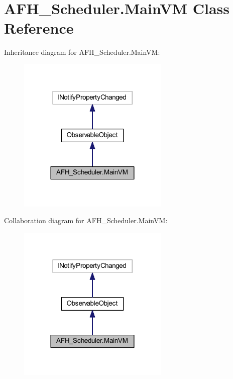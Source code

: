 \section{A\+F\+H\+\_\+\+Scheduler.\+Main\+VM Class Reference}
\label{class_a_f_h___scheduler_1_1_main_v_m}


Inheritance diagram for A\+F\+H\+\_\+\+Scheduler.\+Main\+VM\+:
\nopagebreak
\begin{figure}[H]
\begin{center}
\leavevmode
\includegraphics[width=204pt]{class_a_f_h___scheduler_1_1_main_v_m__inherit__graph}
\end{center}
\end{figure}


Collaboration diagram for A\+F\+H\+\_\+\+Scheduler.\+Main\+VM\+:
\nopagebreak
\begin{figure}[H]
\begin{center}
\leavevmode
\includegraphics[width=204pt]{class_a_f_h___scheduler_1_1_main_v_m__coll__graph}
\end{center}
\end{figure}
